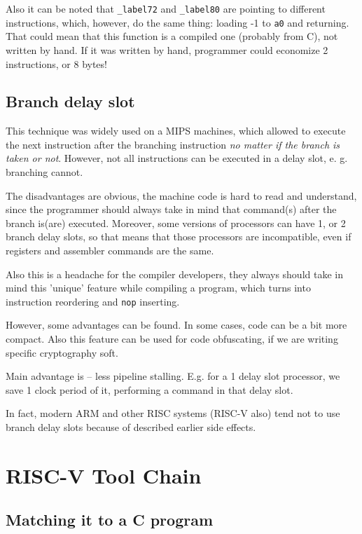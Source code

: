 \documentclass[a4paper]{article}
\begin{document}
Also it can be noted that \texttt{\_label72} and \texttt{\_label80} are pointing to different instructions, which, however, do the same thing: loading -1 to \texttt{a0} and returning.
That could mean that this function is a compiled one (probably from C), not written by hand. If it was written by hand, programmer could economize 2 instructions, or 8 bytes!

\subsection{Branch delay slot}

This technique was widely used on a MIPS machines, which allowed to execute the next instruction after the branching instruction \textit{no matter if the branch is taken or not}.
However, not all instructions can be executed in a delay slot, e. g. branching cannot.

The disadvantages are obvious, the machine code is hard to read and understand, since the programmer should always take in mind that command(s) after the branch is(are) executed.
Moreover, some versions of processors can have 1, or 2 branch delay slots, so that means that those processors are incompatible, even if registers and assembler commands are the same. 

Also this is a headache for the compiler developers, they always should take in mind this 'unique' feature while compiling a program, which turns into instruction reordering and \texttt{nop} inserting.

However, some advantages can be found.
In some cases, code can be a bit more compact.
Also this feature can be used for code obfuscating, if we are writing specific cryptography soft.

Main advantage is -- less pipeline stalling. E.g. for a 1 delay slot processor, we save 1 clock period of it, performing a command in that delay slot.

In fact, modern ARM and other RISC systems (RISC-V also) tend not to use branch delay slots because of described earlier side effects.

\section{RISC-V Tool Chain}
\subsection{Matching it to a C program}
\end{document}

